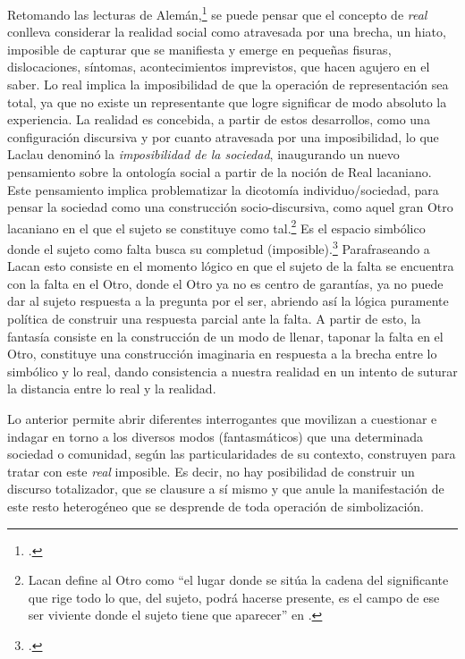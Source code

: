 Retomando las lecturas de Alemán,\footnote{\cite[]{@7108-ALEMAN2010}.} se puede pensar que el concepto de \emph{real} conlleva considerar la realidad social como atravesada por una brecha, un hiato, imposible de capturar que se manifiesta y emerge en pequeñas fisuras, dislocaciones, síntomas, acontecimientos imprevistos, que hacen agujero en el saber. Lo real implica la imposibilidad de que la operación de representación sea total, ya que no existe un representante que logre significar de modo absoluto la experiencia. La realidad es concebida, a partir de estos desarrollos, como una configuración discursiva y por cuanto atravesada por una imposibilidad, lo que Laclau denominó la \emph{imposibilidad de la sociedad}, inaugurando un nuevo pensamiento sobre la ontología social a partir de la noción de Real lacaniano. Este pensamiento implica problematizar la dicotomía individuo/sociedad, para pensar la sociedad como una construcción socio-discursiva, como aquel gran Otro lacaniano en el que el sujeto se constituye como tal.\footnote{Lacan define al Otro como \enquote{el lugar donde se sitúa la cadena del significante que rige todo lo que, del sujeto, podrá hacerse presente, es el campo de ese ser viviente donde el sujeto tiene que aparecer} en \cite[][212]{@7106-LACAN2006}.} Es el espacio simbólico donde el sujeto como falta busca su completud (imposible).\footcite[]{@7003-STAVRAKAKIS2010} Parafraseando a Lacan esto consiste en el momento lógico en que el sujeto de la falta se encuentra con la falta en el Otro, donde el Otro ya no es centro de garantías, ya no puede dar al sujeto respuesta a la pregunta por el ser, abriendo así la lógica puramente política  de construir una respuesta parcial ante la falta. A partir de esto, la fantasía consiste en la construcción de un modo de llenar, taponar la falta en el Otro, constituye una construcción imaginaria en respuesta a la brecha entre lo simbólico y lo real, dando consistencia a nuestra realidad en un intento de suturar la distancia entre lo real y la realidad.

Lo anterior permite abrir diferentes interrogantes que movilizan a cuestionar e indagar en torno a los diversos modos (fantasmáticos) que una determinada sociedad o comunidad, según las particularidades de su contexto, construyen para tratar con este \emph{real} imposible. Es decir, no hay posibilidad de construir un discurso totalizador, que se clausure a sí mismo y que anule la manifestación de este resto heterogéneo que se desprende de toda operación de simbolización.

